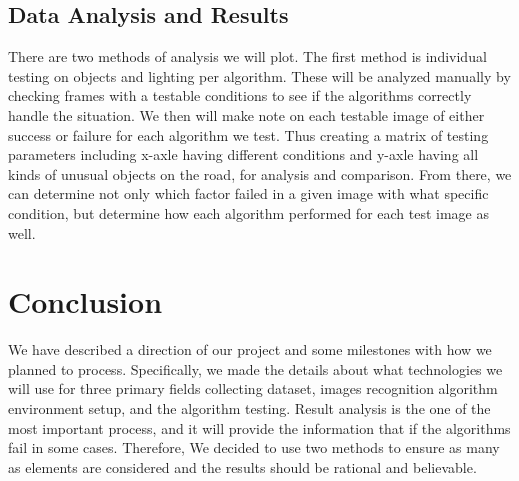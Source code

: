 \subsection{Data Analysis and Results}
There are two methods of analysis we will plot. 
The first method is individual testing on objects and lighting per algorithm. 
These will be analyzed manually by checking frames with a testable conditions to see if the algorithms correctly handle the situation.
We then will make note on each testable image of either success or failure for each algorithm we test.
Thus creating a matrix of testing parameters including x-axle having different conditions and y-axle having all kinds of unusual objects on the road, for analysis and comparison.
From there, we can determine not only which factor failed in a given image with what specific condition, but determine how each algorithm performed for each test image as well. 

\section{Conclusion}
We have described a direction of our project and some milestones with how we planned to process. Specifically, we made the details about what technologies we will use for three primary fields collecting dataset, images recognition algorithm environment setup, and the algorithm testing. Result analysis is the one of the most important process, and it will provide the information that if the algorithms fail in some cases. Therefore, We decided to use two methods to ensure as many as elements are considered and the results should be rational and believable. 
      
      
